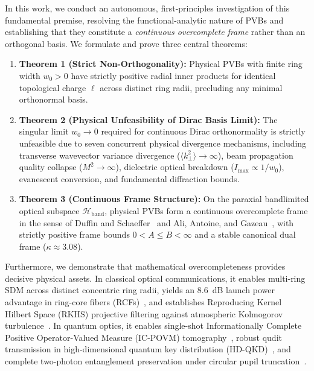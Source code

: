 \documentclass{optica-article}
\begin{document}
In this work, we conduct an autonomous, first-principles investigation of this fundamental premise, resolving the functional-analytic nature of PVBs and establishing that they constitute a \emph{continuous overcomplete frame} rather than an orthogonal basis. We formulate and prove three central theorems:
\begin{enumerate}
    \item \textbf{Theorem 1 (Strict Non-Orthogonality):} Physical PVBs with finite ring width $w_0 > 0$ have strictly positive radial inner products for identical topological charge $\ell$ across distinct ring radii, precluding any minimal orthonormal basis.
    \item \textbf{Theorem 2 (Physical Unfeasibility of Dirac Basis Limit):} The singular limit $w_0 \to 0$ required for continuous Dirac orthonormality is strictly unfeasible due to seven concurrent physical divergence mechanisms, including transverse wavevector variance divergence ($\langle k_\perp^2 \rangle \to \infty$), beam propagation quality collapse ($M^2 \to \infty$), dielectric optical breakdown ($I_{\max} \propto 1/w_0$), evanescent conversion, and fundamental diffraction bounds.
    \item \textbf{Theorem 3 (Continuous Frame Structure):} On the paraxial bandlimited optical subspace $\mathcal{H}_{\text{band}}$, physical PVBs form a continuous overcomplete frame in the sense of Duffin and Schaeffer~\cite{Duffin1952} and Ali, Antoine, and Gazeau~\cite{Ali1993}, with strictly positive frame bounds $0 < A \le B < \infty$ and a stable canonical dual frame ($\kappa \approx 3.08$).
\end{enumerate}

Furthermore, we demonstrate that mathematical overcompleteness provides decisive physical assets. In classical optical communications, it enables multi-ring SDM across distinct concentric ring radii, yields an 8.6~dB launch power advantage in ring-core fibers (RCFs)~\cite{Villalba2023,RojasRojas2021}, and establishes Reproducing Kernel Hilbert Space (RKHS) projective filtering against atmospheric Kolmogorov turbulence~\cite{Kolmogorov1941,Fried1966,Noll1976,Paterson2005,TylerBoyd2009}. In quantum optics, it enables single-shot Informationally Complete Positive Operator-Valued Measure (IC-POVM) tomography~\cite{Renes2004,BraunsteinCaves1994}, robust qudit transmission in high-dimensional quantum key distribution (HD-QKD)~\cite{Cerf2002,Mirhosseini2015,BennettBrassard1984}, and complete two-photon entanglement preservation under circular pupil truncation~\cite{Clauser1969,LawEberly2004,Walborn2010,Sakurai2020}.
\end{document}
